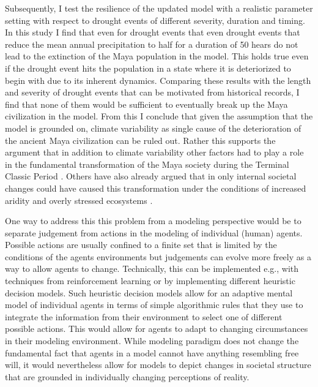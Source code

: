Subsequently, I test the resilience of the updated model with a realistic parameter setting with respect to drought events of different severity, duration and timing. In this study I find that even for drought events that even drought events that reduce the mean annual precipitation to half for a duration of 50 hears do not lead to the extinction of the Maya population in the model. This holds true even if the drought event hits the population in a state where it is deteriorized to begin with due to its inherent dynamics. Comparing these results with the length and severity of drought events that can be motivated from historical records, I find that none of them would be sufficient to eventually break up the Maya civilization in the model.
From this I conclude that given the assumption that the model is grounded on, climate variability as single cause of the deterioration of the ancient Maya civilization can be ruled out. Rather this supports the argument that in addition to climate variability other factors had to play a role in the fundamental transformation of the Maya society during the Terminal Classic Period \citep{Masson2012}. Others have also already argued that in only internal societal changes could have caused this transformation under the conditions of increased aridity and overly stressed ecosystems \citep{Turner2012a}.

One way to address this this problem from a modeling perspective would be to separate judgement from actions in the modeling of individual (human) agents. Possible actions are usually confined to a finite set that is limited by the conditions of the agents environments but judgements can evolve more freely as a way to  allow agents to change. Technically, this can be implemented e.g., with techniques from reinforcement learning \citep{Bu2008} or by implementing different heuristic decision models. Such heuristic decision models allow for an adaptive mental model of individual agents in terms of simple algorithmic rules that they use to integrate the information from their environment to select one of different possible actions.
This would allow for agents to adapt to changing circumstances in their modeling environment. While modeling paradigm does not change the fundamental fact that agents in a model cannot have anything resembling free will, it would nevertheless allow for models to depict changes in societal structure that are grounded in individually changing perceptions of reality.

